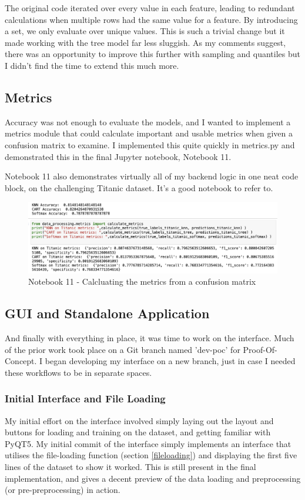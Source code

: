 \documentclass[letterpaper,10pt]{article}
\begin{document}
The original code iterated over every value in each feature, leading to redundant calculations when multiple rows had the same value for a feature. By introducing a set, we only evaluate over unique values. This is such a trivial change but it made working with the tree model far less sluggish. As my comments suggest, there was an opportunity to improve this further with sampling and quantiles but I didn't find the time to extend this much more. \par

\subsection{Metrics}
Accuracy was not enough to evaluate the models, and I wanted to implement a metrics module that could calculate important and usable metrics when given a confusion matrix to examine. I implemented this quite quickly in metrics.py and demonstrated this in the final Jupyter notebook, Notebook 11. \par
Notebook 11 also demonstrates virtually all of my backend logic in one neat code block, on the challenging Titanic dataset. It's a good notebook to refer to. \par

\begin{figure}
    \centering
    \includegraphics[width=0.9\linewidth]{notebook11_metrics.png}
    \caption{Notebook 11 - Calcluating the metrics from a confusion matrix}
    \label{fig:notebook11_metrics}
\end{figure}

\subsection{GUI and Standalone Application}
And finally with everything in place, it was time to work on the interface. Much of the prior work took place on a Git branch named 'dev-poc' for Proof-Of-Concept. I began developing my interface on a new branch, just in case I needed these workflows to be in separate spaces. \par


\subsubsection{Initial Interface and File Loading}
My initial effort on the interface involved simply laying out the layout and buttons for loading and training on the dataset, and getting familiar with PyQT5. My initial commit of the interface simply implements an interface that utilises the file-loading function (section \ref{fileloading}) and displaying the first five lines of the dataset to show it worked. This is still present in the final implementation, and gives a decent preview of the data loading and preprocessing (or pre-preprocessing) in action. 
\end{document}
